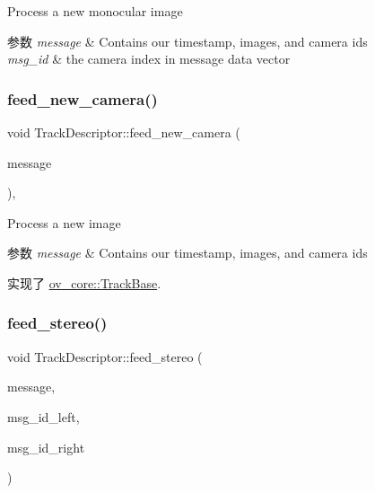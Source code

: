 Process a new monocular image 


\begin{DoxyParams}{参数}
{\em message} & Contains our timestamp, images, and camera ids \\
\hline
{\em msg\+\_\+id} & the camera index in message data vector \\
\hline
\end{DoxyParams}
\mbox{\label{classov__core_1_1TrackDescriptor_afcbf3078992f740582eac24e3164e6f1}} 
\subsubsection{\texorpdfstring{feed\+\_\+new\+\_\+camera()}{feed\_new\_camera()}}
{\footnotesize\ttfamily void Track\+Descriptor\+::feed\+\_\+new\+\_\+camera (\begin{DoxyParamCaption}\item[{const \hyperlink{structov__core_1_1CameraData}{Camera\+Data} \&}]{message }\end{DoxyParamCaption})\hspace{0.3cm}{\ttfamily [override]}, {\ttfamily [virtual]}}



Process a new image 


\begin{DoxyParams}{参数}
{\em message} & Contains our timestamp, images, and camera ids \\
\hline
\end{DoxyParams}


实现了 \hyperlink{classov__core_1_1TrackBase_a18f208f4047e9a1955406806ba68a8c1}{ov\+\_\+core\+::\+Track\+Base}.

\mbox{\label{classov__core_1_1TrackDescriptor_a4f182f8ee96c73f9105a8a1fa3f5eee1}} 
\subsubsection{\texorpdfstring{feed\+\_\+stereo()}{feed\_stereo()}}
{\footnotesize\ttfamily void Track\+Descriptor\+::feed\+\_\+stereo (\begin{DoxyParamCaption}\item[{const \hyperlink{structov__core_1_1CameraData}{Camera\+Data} \&}]{message,  }\item[{size\+\_\+t}]{msg\+\_\+id\+\_\+left,  }\item[{size\+\_\+t}]{msg\+\_\+id\+\_\+right }\end{DoxyParamCaption})\hspace{0.3cm}{\ttfamily [protected]}}



